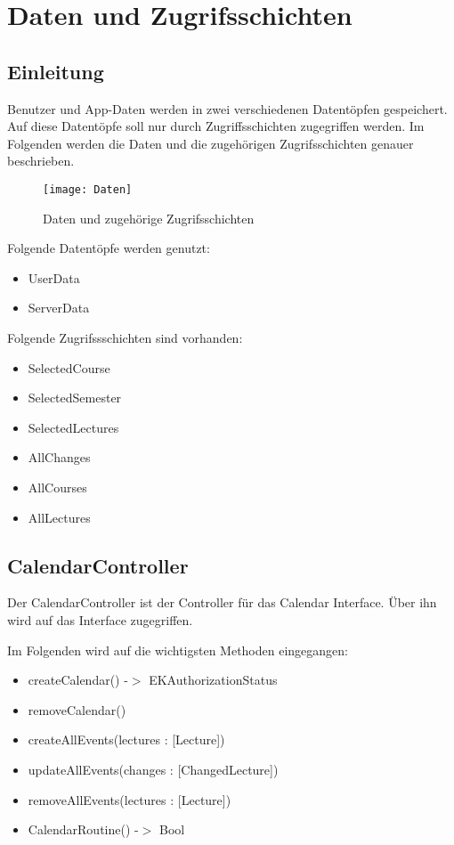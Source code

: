 \chapter{Daten und Zugrifsschichten}
\section{Einleitung}
Benutzer und App-Daten werden in zwei verschiedenen Datentöpfen gespeichert. Auf diese Datentöpfe soll nur durch Zugriffsschichten zugegriffen werden. Im Folgenden werden die Daten und die zugehörigen Zugrifsschichten genauer beschrieben.
\begin{figure}[htb]
    \centering
    \texttt{[image: Daten]}
    \caption{Daten und zugehörige Zugrifsschichten}
\end{figure}

Folgende Datentöpfe werden genutzt:
\begin{itemize}
     \item UserData
     \item ServerData
\end{itemize}

Folgende Zugrifssschichten sind vorhanden:
\begin{itemize}
     \item SelectedCourse
     \item SelectedSemester
     \item SelectedLectures
     \item AllChanges
     \item AllCourses
     \item AllLectures
\end{itemize}

\newpage
\section{CalendarController}
Der CalendarController ist der Controller für das Calendar Interface. Über ihn wird auf das Interface zugegriffen.

Im Folgenden wird auf die wichtigsten Methoden eingegangen:
\begin{itemize}
     \item createCalendar() -$>$ EKAuthorizationStatus
     \item removeCalendar()
     \item createAllEvents(lectures : [Lecture])
     \item updateAllEvents(changes : [ChangedLecture])
     \item removeAllEvents(lectures : [Lecture])
     \item CalendarRoutine() -$>$ Bool
\end{itemize}

